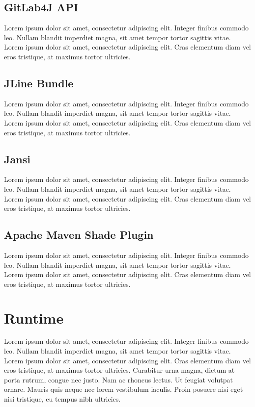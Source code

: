 \documentclass[
  digital,     %
  oneside,     %
  nosansbold,  %
  nocolorbold, %
  lof,         %
  lot,         %
]{fithesis4}
\begin{document}
\subsection{GitLab4J API}
Lorem ipsum dolor sit amet, consectetur adipiscing elit. Integer finibus commodo leo. Nullam blandit imperdiet magna, sit amet tempor tortor sagittis vitae. Lorem ipsum dolor sit amet, consectetur adipiscing elit. Cras elementum diam vel eros tristique, at maximus tortor ultricies.

\subsection{JLine Bundle}
Lorem ipsum dolor sit amet, consectetur adipiscing elit. Integer finibus commodo leo. Nullam blandit imperdiet magna, sit amet tempor tortor sagittis vitae. Lorem ipsum dolor sit amet, consectetur adipiscing elit. Cras elementum diam vel eros tristique, at maximus tortor ultricies.

\subsection{Jansi}
Lorem ipsum dolor sit amet, consectetur adipiscing elit. Integer finibus commodo leo. Nullam blandit imperdiet magna, sit amet tempor tortor sagittis vitae. Lorem ipsum dolor sit amet, consectetur adipiscing elit. Cras elementum diam vel eros tristique, at maximus tortor ultricies.

\subsection{Apache Maven Shade Plugin}
Lorem ipsum dolor sit amet, consectetur adipiscing elit. Integer finibus commodo leo. Nullam blandit imperdiet magna, sit amet tempor tortor sagittis vitae. Lorem ipsum dolor sit amet, consectetur adipiscing elit. Cras elementum diam vel eros tristique, at maximus tortor ultricies.
\shorthandon{-}

\section{Runtime}
Lorem ipsum dolor sit amet, consectetur adipiscing elit. Integer finibus commodo leo. Nullam blandit imperdiet magna, sit amet tempor tortor sagittis vitae. Lorem ipsum dolor sit amet, consectetur adipiscing elit. Cras elementum diam vel eros tristique, at maximus tortor ultricies. Curabitur urna magna, dictum at porta rutrum, congue nec justo. Nam ac rhoncus lectus. Ut feugiat volutpat ornare. Mauris quis neque nec lorem vestibulum iaculis. Proin posuere nisi eget nisi tristique, eu tempus nibh ultricies.
\end{document}
